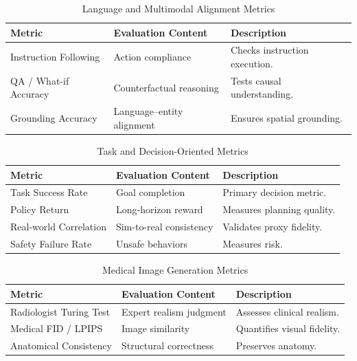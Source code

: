 \documentclass[pdflatex,sn-mathphys-num]{sn-jnl}
\theoremstyle{thmstyleone}%
\theoremstyle{thmstyletwo}%
\theoremstyle{thmstylethree}%
\begin{document}
\begin{table}[t!]
\centering
\caption{Language and Multimodal Alignment Metrics}
\label{3}
\begin{tabular}{l|l|l}
\hline
\textbf{Metric} & \textbf{Evaluation Content} & \textbf{Description} \\
\hline
Instruction Following & Action compliance & Checks instruction execution. \\
QA / What-if Accuracy & Counterfactual reasoning & Tests causal understanding. \\
Grounding Accuracy & Language--entity alignment & Ensures spatial grounding. \\
\hline
\end{tabular}
\end{table}


\begin{table}[t!]
\centering
\caption{Task and Decision-Oriented Metrics}
\label{4}
\begin{tabular}{l|l|l}
\hline
\textbf{Metric} & \textbf{Evaluation Content} & \textbf{Description} \\
\hline
Task Success Rate & Goal completion & Primary decision metric. \\
Policy Return & Long-horizon reward & Measures planning quality. \\
Real-world Correlation & Sim-to-real consistency & Validates proxy fidelity. \\
Safety Failure Rate & Unsafe behaviors & Measures risk. \\
\hline
\end{tabular}
\end{table}


\begin{table}[t!]
\centering
\caption{Medical Image Generation Metrics}
\label{5}
\begin{tabular}{l|l|l}
\hline
\textbf{Metric} & \textbf{Evaluation Content} & \textbf{Description} \\
\hline
Radiologist Turing Test & Expert realism judgment & Assesses clinical realism. \\
Medical FID / LPIPS & Image similarity & Quantifies visual fidelity. \\
Anatomical Consistency & Structural correctness & Preserves anatomy. \\
\hline
\end{tabular}
\end{table}
\end{document}
